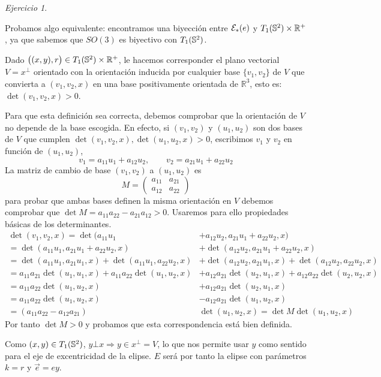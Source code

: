\documentclass[12pt,spanish]{article}
\theoremstyle{definition}
\theoremstyle{remark}
\newtheorem{exercise}{Ejercicio}
\newcommand{\R}{\mathbb{R}}
\begin{document}
\begin{exercise}
\begin{enumerate}[a)]
    Probamos algo equivalente: encontramos una biyección entre $\mathcal{E}_*(e)$ y
    $\T\times\R^+$, ya que sabemos que $SO(3)$ es biyectivo con $T_1(\mathbb{S}^2)$.

    Dado $\big((x,y),r\big)\in\T\times\R^+$, le hacemos corresponder
    el plano vectorial $V=x^\bot$ orientado con la orientación
    inducida por cualquier base $\{v_1,v_2\}$ de $V$ que convierta a
    $(v_1,v_2,x)$ en una base positivamente orientada de $\R^3$, esto
    es: $\det(v_1,v_2,x)>0$.

    Para que esta definición sea correcta, debemos comprobar que la
    orientación de $V$ no depende de la base escogida. En efecto, si
    $(v_1,v_2)$ y $(u_1,u_2)$ son dos bases de $V$ que cumplen
    $\det(v_1,v_2,x), \det(u_1,u_2,x)>0$, escribimos $v_1$ y $v_2$ en
    función de $(u_1,u_2)$,
    \[v_1=a_{11}u_1+a_{12}u_2,\qquad v_2=a_{21}u_1+a_{22}u_2\] La
    matriz de cambio de base $(v_1,v_2)$ a $(u_1,u_2)$ es
    \[M=\begin{pmatrix}
        a_{11} & a_{21} \\
        a_{12} & a_{22}
      \end{pmatrix}\] para probar que ambas bases definen la misma
    orientación en $V$ debemos comprobar que
    $\det M=a_{11}a_{22}-a_{21}a_{12}>0$. Usaremos para ello
    propiedades básicas de los determinantes.
    \begin{align*}
      \det(v_1,v_2,x)=\det(a_{11}u_1&+a_{12}u_2,a_{21}u_1+a_{22}u_2,x) \\
       =\det(a_{11}u_1,a_{21}u_1+a_{22}u_2,x)&+\det(a_{12}u_2,a_{21}u_1+a_{22}u_2,x) \\
      =\det(a_{11}u_1,a_{21}u_1,x)+\det(a_{11}u_1,a_{22}u_2,x)&+\det(a_{12}u_2,a_{21}u_1,x)+\det(a_{12}u_2,a_{22}u_2,x) \\
      =a_{11}a_{21}\det(u_1,u_1,x)+a_{11}a_{22}\det(u_1,u_2,x)&+a_{12}a_{21}\det(u_2,u_1,x)+a_{12}a_{22}\det(u_2,u_2,x) \\
      =a_{11}a_{22}\det(u_1,u_2,x)&+a_{12}a_{21}\det(u_2,u_1,x) \\
      =a_{11}a_{22}\det(u_1,u_2,x)&-a_{12}a_{21}\det(u_1,u_2,x) \\
      =(a_{11}a_{22}-a_{12}a_{21})&\det(u_1,u_2,x) = \det M \det(u_1,u_2,x)
    \end{align*}
    Por tanto $\det M>0$ y probamos que esta correspondencia está bien
    definida.

    Como $(x,y)\in T_1(\mathbb{S}^2)$, $y\bot x\Rightarrow y\in x^\bot = V$, lo que
    nos permite usar $y$ como sentido para el eje de excentricidad de
    la elipse. $E$ será por tanto la elipse con parámetros $k=r$ y
    $\vec{e}=ey$.


\end{enumerate}
\end{exercise}
\end{document}
